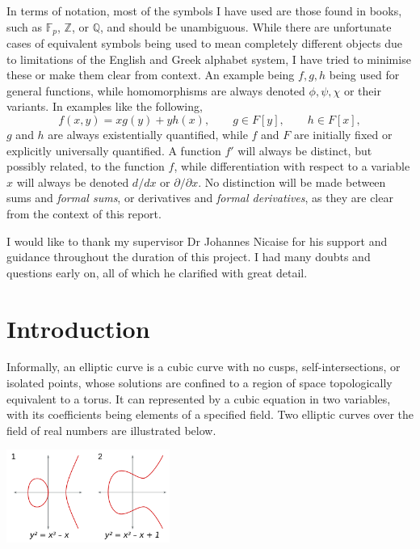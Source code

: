 \documentclass{article}
\newcommand{\F}{\mathbb{F}}
\newcommand{\Z}{\mathbb{Z}}
\newcommand{\Q}{\mathbb{Q}}
\newcommand{\rb}[1]{\left( #1 \right)}
\renewcommand{\sb}[1]{\left[ #1 \right]}
\theoremstyle{definition}\newtheorem*{definition}{Definition}
\theoremstyle{definition}\newtheorem*{example}{Example}
\theoremstyle{definition}\newtheorem*{remark}{Remark}
\begin{document}
In terms of notation, most of the symbols I have used are those found in books, such as $ \F_p $, $ \Z $, or $ \Q $, and should be unambiguous. While there are unfortunate cases of equivalent symbols being used to mean completely different objects due to limitations of the English and Greek alphabet system, I have tried to minimise these or make them clear from context. An example being $ f, g, h $ being used for general functions, while homomorphisms are always denoted $ \phi, \psi, \chi $ or their variants. In examples like the following,
$$ f\rb{x, y} = xg\rb{y} + yh\rb{x}, \qquad g \in F\sb{y}, \qquad h \in F\sb{x}, $$
$ g $ and $ h $ are always existentially quantified, while $ f $ and $ F $ are initially fixed or explicitly universally quantified. A function $ f' $ will always be distinct, but possibly related, to the function $ f $, while differentiation with respect to a variable $ x $ will always be denoted $ d / dx $ or $ \partial / \partial x $. No distinction will be made between sums and \emph{formal sums}, or derivatives and \emph{formal derivatives}, as they are clear from the context of this report.

I would like to thank my supervisor Dr Johannes Nicaise for his support and guidance throughout the duration of this project. I had many doubts and questions early on, all of which he clarified with great detail.

\pagebreak

\section{Introduction}

Informally, an elliptic curve is a cubic curve with no cusps, self-intersections, or isolated points, whose solutions are confined to a region of space topologically equivalent to a torus. It can represented by a cubic equation in two variables, with its coefficients being elements of a specified field. Two elliptic curves over the field of real numbers are illustrated below.

\begin{center}
\includegraphics*[width=0.4\textwidth]{img/ECClines-3.png}
\end{center}
\end{document}
